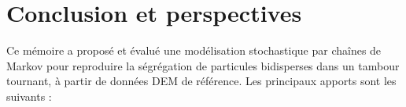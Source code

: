 \documentclass[french]{MemoireMaster}
\begin{document}

\section{Conclusion et perspectives}
\label{sec:conclusion}

Ce mémoire a proposé et évalué une modélisation stochastique par chaînes de Markov pour reproduire la ségrégation de particules bidisperses dans un tambour tournant, à partir de données DEM de référence. Les principaux apports sont les suivants :
\end{document}
